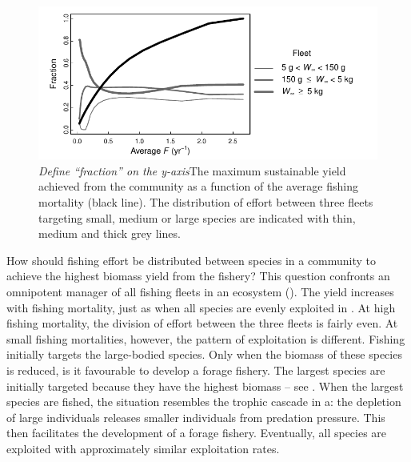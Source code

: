 \begin{figure}[t]
  \centering
  \includegraphics{ChapterCommunityFishing/communityMSY.pdf}
  \caption{\emph{Define ``fraction'' on the y-axis}The maximum sustainable yield achieved from the community as a function of the average fishing mortality (black line).  The distribution of effort between three fleets targeting small, medium or large species are indicated with thin, medium and thick grey lines. }
  \label{fig:communityMSY}
\end{figure}

How should fishing effort be distributed between species in a community to achieve the highest biomass yield from the fishery?  This question confronts an omnipotent manager of all fishing fleets in an ecosystem ().  The yield increases with fishing mortality, just as when all species are evenly exploited in .  At high fishing mortality, the division of effort between the three fleets is fairly even.  At small fishing mortalities, however, the pattern of exploitation is different.  Fishing initially targets the large-bodied species. Only when the biomass of these species is reduced, is it favourable to develop a forage fishery.  The largest species are initially targeted because they have the highest biomass -- see .  When the largest species are fished, the situation resembles the trophic cascade in a: the depletion of large individuals releases smaller individuals from predation pressure.  This then facilitates the development of a forage fishery.  Eventually, all species are exploited with approximately similar exploitation rates. 

